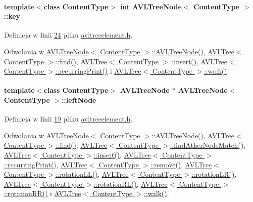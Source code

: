 \hypertarget{class_a_v_l_tree_node_a717c2f6c33504a065570802e95189a57}{
\paragraph[{key}]{\setlength{\rightskip}{0pt plus 5cm}template$<$class Content\-Type$>$ int {\bf A\-V\-L\-Tree\-Node}$<$ Content\-Type $>$\-::key}}\label{class_a_v_l_tree_node_a717c2f6c33504a065570802e95189a57}


Definicja w linii \hyperlink{avltreeelement_8h_source_l00024}{24} pliku \hyperlink{avltreeelement_8h_source}{avltreeelement.\-h}.



Odwołania w \hyperlink{avltreeelement_8h_source_l00027}{A\-V\-L\-Tree\-Node$<$ Content\-Type $>$\-::\-A\-V\-L\-Tree\-Node()}, \hyperlink{avltree_8h_source_l00229}{A\-V\-L\-Tree$<$ Content\-Type $>$\-::find()}, \hyperlink{avltree_8h_source_l00040}{A\-V\-L\-Tree$<$ Content\-Type $>$\-::insert()}, \hyperlink{avltree_8h_source_l00364}{A\-V\-L\-Tree$<$ Content\-Type $>$\-::recurring\-Print()} i \hyperlink{avltree_8h_source_l00370}{A\-V\-L\-Tree$<$ Content\-Type $>$\-::walk()}.

\hypertarget{class_a_v_l_tree_node_afc53d4774f375c23795c9eb598f4d7cd}{
\paragraph[{left\-Node}]{\setlength{\rightskip}{0pt plus 5cm}template$<$class Content\-Type$>$ {\bf A\-V\-L\-Tree\-Node} $\ast$ {\bf A\-V\-L\-Tree\-Node}$<$ Content\-Type $>$\-::left\-Node}}\label{class_a_v_l_tree_node_afc53d4774f375c23795c9eb598f4d7cd}


Definicja w linii \hyperlink{avltreeelement_8h_source_l00019}{19} pliku \hyperlink{avltreeelement_8h_source}{avltreeelement.\-h}.



Odwołania w \hyperlink{avltreeelement_8h_source_l00027}{A\-V\-L\-Tree\-Node$<$ Content\-Type $>$\-::\-A\-V\-L\-Tree\-Node()}, \hyperlink{avltree_8h_source_l00229}{A\-V\-L\-Tree$<$ Content\-Type $>$\-::find()}, \hyperlink{avltree_8h_source_l00253}{A\-V\-L\-Tree$<$ Content\-Type $>$\-::find\-Ather\-Node\-Match()}, \hyperlink{avltree_8h_source_l00040}{A\-V\-L\-Tree$<$ Content\-Type $>$\-::insert()}, \hyperlink{avltree_8h_source_l00364}{A\-V\-L\-Tree$<$ Content\-Type $>$\-::recurring\-Print()}, \hyperlink{avltree_8h_source_l00271}{A\-V\-L\-Tree$<$ Content\-Type $>$\-::remove()}, \hyperlink{avltree_8h_source_l00151}{A\-V\-L\-Tree$<$ Content\-Type $>$\-::rotation\-L\-L()}, \hyperlink{avltree_8h_source_l00201}{A\-V\-L\-Tree$<$ Content\-Type $>$\-::rotation\-L\-R()}, \hyperlink{avltree_8h_source_l00177}{A\-V\-L\-Tree$<$ Content\-Type $>$\-::rotation\-R\-L()}, \hyperlink{avltree_8h_source_l00125}{A\-V\-L\-Tree$<$ Content\-Type $>$\-::rotation\-R\-R()} i \hyperlink{avltree_8h_source_l00370}{A\-V\-L\-Tree$<$ Content\-Type $>$\-::walk()}.

